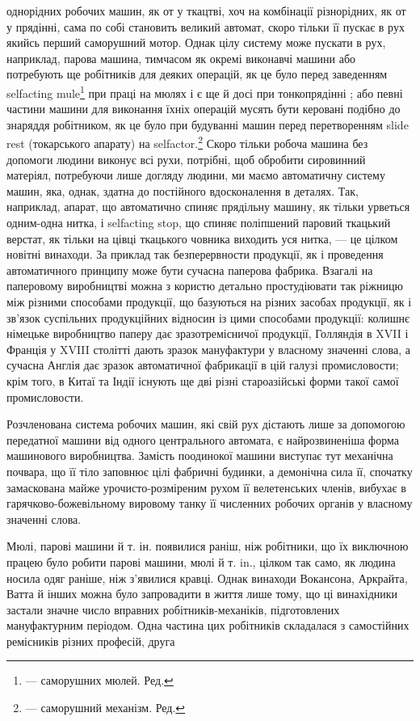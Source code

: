 однорідних робочих машин, як от у ткацтві, хоч на комбінації
різнорідних, як от у прядінні, сама по собі становить великий
автомат, скоро тільки її пускає в рух якийсь перший саморушний
мотор. Однак цілу систему може пускати в рух, наприклад,
парова машина, тимчасом як окремі виконавчі машини або потребують
ще робітників для деяких операцій, як це було перед заведенням
selfacting mule\footnote*{
— саморушних мюлей. Ред.
} при праці на мюлях і є ще й досі при тонкопрядінні
; або певні частини машини для виконання їхніх операцій
мусять бути керовані подібно до знаряддя робітником, як це було
при будуванні машин перед перетворенням slide rest (токарського
апарату) на selfactor.\footnote*{
— саморушний механізм. Ред.
} Скоро тільки робоча машина без допомоги
людини виконує всі рухи, потрібні, щоб обробити сировинний
матеріял, потребуючи лише догляду людини, ми маємо автоматичну
систему машин, яка, однак, здатна до постійного вдосконалення
в деталях. Так, наприклад, апарат, що автоматично
спиняє прядільну машину, як тільки урветься одним-одна нитка,
і selfacting stop, що спиняє поліпшений паровий ткацький верстат,
як тільки на цівці ткацького човника виходить уся нитка, — це
цілком новітні винаходи. За приклад так безперервности продукції,
як і проведення автоматичного принципу може бути сучасна
паперова фабрика. Взагалі на паперовому виробництві можна з користю
детально простудіювати так ріжницю між різними способами
продукції, що базуються на різних засобах продукції, як
і зв’язок суспільних продукційних відносин із цими способами
продукції: колишнє німецьке виробництво паперу дає зразотремісничої
продукції, Голляндія в XVII і Франція у XVIII столітті
дають зразок мануфактури у власному значенні слова, а сучасна
Англія дає зразок автоматичної фабрикації в цій галузі промисловости;
крім того, в Китаї та Індії існують ще дві різні староазійські
форми такої самої промисловости.

Розчленована система робочих машин, які свій рух дістають лише
за допомогою передатної машини від одного центрального автомата,
є найрозвиненіша форма машинового виробництва. Замість
поодинокої машини виступає тут механічна почвара, що її тіло
заповнює цілі фабричні будинки, а демонічна сила її, спочатку
замаскована майже урочисто-розміреним рухом її велетенських
членів, вибухає в гарячково-божевільному вировому танку її
численних робочих органів у власному значенні слова.

Мюлі, парові машини й т. ін. появилися раніш, ніж робітники,
що їх виключною працею було робити парові машини, мюлі й
т. in., цілком так само, як людина носила одяг раніше, ніж з’явилися
кравці. Однак винаходи Вокансона, Аркрайта, Ватта
й інших можна було запровадити в життя лише тому, що ці винахідники
застали значне число вправних робітників-механіків,
підготовлених мануфактурним періодом. Одна частина цих робітників
складалася з самостійних ремісників різних професій, друга